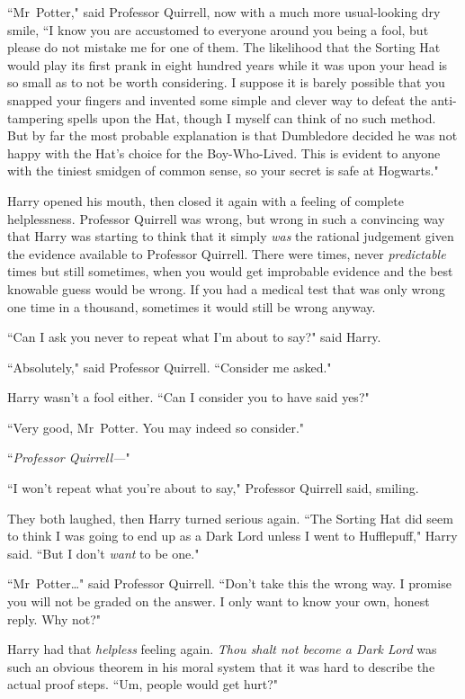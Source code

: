 ``Mr~Potter," said Professor Quirrell, now with a much more usual-looking dry smile, ``I know you are accustomed to everyone around you being a fool, but please do not mistake me for one of them. The likelihood that the Sorting Hat would play its first prank in eight hundred years while it was upon your head is so small as to not be worth considering. I suppose it is barely possible that you snapped your fingers and invented some simple and clever way to defeat the anti-tampering spells upon the Hat, though I myself can think of no such method. But by far the most probable explanation is that Dumbledore decided he was not happy with the Hat's choice for the Boy-Who-Lived. This is evident to anyone with the tiniest smidgen of common sense, so your secret is safe at Hogwarts."

Harry opened his mouth, then closed it again with a feeling of complete helplessness. Professor Quirrell was wrong, but wrong in such a convincing way that Harry was starting to think that it simply \emph{was} the rational judgement given the evidence available to Professor Quirrell. There were times, never \emph{predictable} times but still sometimes, when you would get improbable evidence and the best knowable guess would be wrong. If you had a medical test that was only wrong one time in a thousand, sometimes it would still be wrong anyway.

``Can I ask you never to repeat what I'm about to say?" said Harry.

``Absolutely," said Professor Quirrell. ``Consider me asked."

Harry wasn't a fool either. ``Can I consider you to have said yes?"

``Very good, Mr~Potter. You may indeed so consider."

``\emph{Professor Quirrell—}"

``I won't repeat what you're about to say," Professor Quirrell said, smiling.

They both laughed, then Harry turned serious again. ``The Sorting Hat did seem to think I was going to end up as a Dark Lord unless I went to Hufflepuff," Harry said. ``But I don't \emph{want} to be one."

``Mr~Potter{\ldots}" said Professor Quirrell. ``Don't take this the wrong way. I promise you will not be graded on the answer. I only want to know your own, honest reply. Why not?"

Harry had that \emph{helpless} feeling again. \emph{Thou shalt not become a Dark Lord} was such an obvious theorem in his moral system that it was hard to describe the actual proof steps. ``Um, people would get hurt?"

